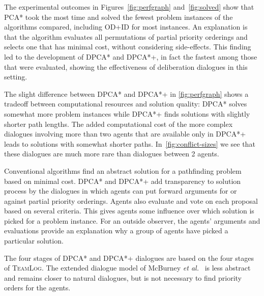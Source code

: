 
The experimental outcomes in Figures~\ref{fig:perfgraph} and~\ref{fig:solved} show that PCA* took the most 
time and solved the fewest problem instances of the algorithms compared, including OD+ID for most instances. An explanation is that the algorithm 
evaluates all permutations of partial priority orderings and selects one that has
minimal cost, without considering side-effects. This finding led to the development of DPCA* and DPCA*+, in fact the fastest among those that were evaluated, showing the effectiveness of deliberation 
dialogues in this setting.

The slight difference between DPCA* and DPCA*+ in \autoref{fig:perfgraph} shows a tradeoff between computational resources and solution quality: DPCA* solves somewhat more problem 
instances while DPCA*+ finds solutions with slightly shorter path lengths.
The added computational cost of the more complex dialogues involving more than two agents that are available only in DPCA*+ leads to solutions with somewhat shorter paths. In~\autoref{fig:conflict-sizes} we see that these dialogues are much more rare than dialogues between 2 agents. 

Conventional algorithms find an abstract solution for a pathfinding problem based on minimal cost. DPCA* and DPCA*+ add transparency to solution process by the dialogues in which agents can put forward arguments for or against 
partial 
priority orderings. Agents also evaluate and vote on each proposal based on several 
criteria. This gives agents some influence over which solution 
is picked for a problem instance. For an outside observer, the agents' arguments and evaluations provide an explanation why a group of agents have picked a particular 
solution. 

The four stages of DPCA* and DPCA*+ dialogues are based on the 
four stages of \textsc{TeamLog}. The extended dialogue model of 
McBurney \emph{et al.}~ is less abstract and remains closer to natural dialogues, but is not necessary to find 
priority orders for the agents. 

